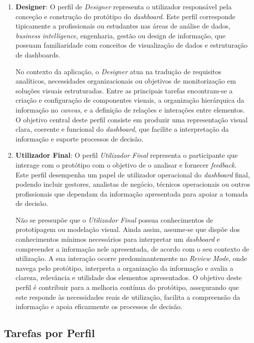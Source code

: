 \begin{enumerate}
    \item \textbf{Designer}: O perfil de \textit{Designer} representa o utilizador responsável pela conceção e construção do protótipo do \textit{dashboard}. Este perfil corresponde tipicamente a profissionais ou estudantes nas áreas de análise de dados, \textit{business intelligence}, engenharia, gestão ou design de informação, que possuam familiaridade com conceitos de visualização de dados e estruturação de dashboards.

    No contexto da aplicação, o \textit{Designer} atua na tradução de requisitos analíticos, necessidades organizacionais ou objetivos de monitorização em soluções visuais estruturadas. Entre as principais tarefas encontram-se a criação e configuração de componentes visuais, a organização hierárquica da informação no \textit{canvas}, e a definição de relações e interações entre elementos. O objetivo central deste perfil consiste em produzir uma representação visual clara, coerente e funcional do \textit{dashboard}, que facilite a interpretação da informação e suporte processos de decisão.

    \item \textbf{Utilizador Final}: O perfil \textit{Utilizador Final} representa o participante que interage com o protótipo com o objetivo de o analisar e fornecer \textit{feedback}. Este perfil desempenha um papel de utilizador operacional do \textit{dashboard} final, podendo incluir gestores, analistas de negócio, técnicos operacionais ou outros profissionais que dependam da informação apresentada para apoiar a tomada de decisão.

    Não se pressupõe que o \textit{Utilizador Final} possua conhecimentos de prototipagem ou modelação visual. Ainda assim, assume-se que dispõe dos conhecimentos mínimos necessários para interpretar um \textit{dashboard} e compreender a informação nele apresentada, de acordo com o seu contexto de utilização. A sua interação ocorre predominantemente no \textit{Review Mode}, onde navega pelo protótipo, interpreta a organização da informação e avalia a clareza, relevância e utilidade dos elementos apresentados. O objetivo deste perfil é contribuir para a melhoria contínua do protótipo, assegurando que este responde às necessidades reais de utilização, facilita a compreensão da informação e apoia eficazmente os processos de decisão.
\end{enumerate}

\subsection{Tarefas por Perfil}
\label{subsec:cap5_tasks}

